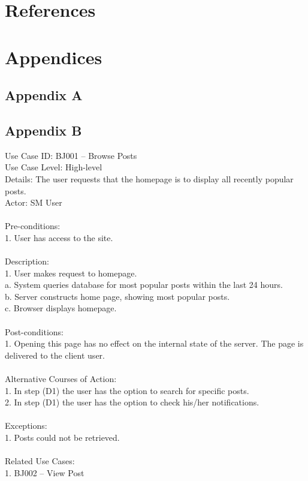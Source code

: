 \documentclass{report}
\begin{document}
\chapter{References}
\chapter{Appendices}
\section{Appendix A}
\section{Appendix B}
Use Case ID: BJ001 – Browse Posts\\
Use Case Level: High-level\\
Details: The user requests that the homepage is to display all recently popular posts.\\
Actor: SM User\\
\\
Pre-conditions:\\
1.	User has access to the site.\\
\\
Description:\\
1.	User makes request to homepage.\\
a.	System queries database for most popular posts within the last 24 hours.\\
b.	Server constructs home page, showing most popular posts.\\
c.	Browser displays homepage.\\
\\
Post-conditions: \\
1.	Opening this page has no effect on the internal state of the server. The page is delivered to the client user.\\
\\
Alternative Courses of Action:\\
1.	In step (D1) the user has the option to search for specific posts.\\
2.	In step (D1) the user has the option to check his/her notifications.\\
\\
Exceptions: \\
1.	Posts could not be retrieved.\\
\\
Related Use Cases: \\
1.	BJ002 – View Post\\
\end{document}

